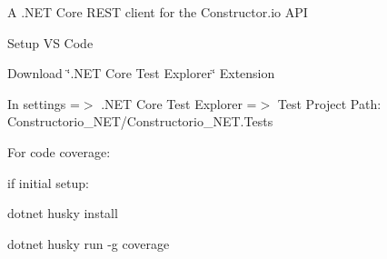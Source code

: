 \label{index_md_README}%
%
A .NET Core REST client for the Constructor.\+io API

Setup VS Code
\begin{DoxyItemize}
\item Download \char`\"{}.\+NET Core Test Explorer\char`\"{} Extension
\item In settings =\texorpdfstring{$>$}{>} .NET Core Test Explorer =\texorpdfstring{$>$}{>} Test Project Path\+: Constructorio\+\_\+\+NET/\+Constructorio\+\_\+\+NET.\+Tests
\end{DoxyItemize}

For code coverage\+:
\begin{DoxyItemize}
\item if initial setup\+:
\begin{DoxyItemize}
\item dotnet husky install
\end{DoxyItemize}
\item dotnet husky run -\/g coverage 
\end{DoxyItemize}